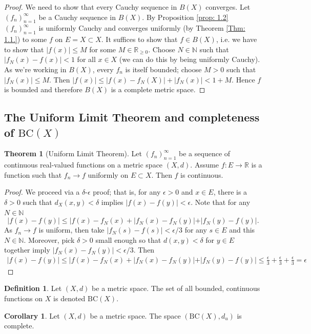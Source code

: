 \documentclass[oneside]{amsart}
\theoremstyle{definition}
\newtheorem{defi}{Definition}[section]
\newtheorem{theorem}{Theorem}[section]
\newtheorem{coro}{Corollary}[section]
\newcommand{\rr}{\mathbb R}
\newcommand{\nn}{\mathbb N}
\begin{document}
\begin{proof} We need to show that every Cauchy sequence in $B(X)$ converges. Let $(f_n)_{n=1}^\infty$ be a Cauchy sequence in $B(X)$. By Proposition \ref{prop: 1.2} $(f_n)_{n=1}^\infty$ is uniformly Cauchy and converges uniformly (by Theorem \ref{Thm: 1.1.}) to some $f$ on $E = X \subset X$. It suffices to show that $f \in B(X)$, i.e. we have to show that $|f(x)| \leq M$ for some $M \in \rr_{\geq 0}$. Choose $N \in \nn$ such that $|f_N(x) - f(x) | < 1$ for all $x \in X$ (we can do this by being uniformly Cauchy). As we're working in $B(X)$, every $f_n$ is itself bounded; choose $M > 0$ such that $|f_N(x)| \leq M$. Then $ |f(x)| \leq  |f(x) - f_N(X)| + |f_N(x)| < 1 +M$. Hence $f$ is bounded and therefore $B(X)$ is a complete metric space. 
\end{proof}
\subsection{The Uniform Limit Theorem and completeness of $\text{BC}(X)$ }
\begin{theorem}[Uniform Limit Theorem]
	Let $(f_n)_{n=1}^\infty$ be a sequence of continuous real-valued functions on a metric space $(X,d)$. Assume $f \colon E \to \rr$ is a function such that $f_n \to f$ uniformly on $E \subset X$. Then $f$ is continuous.
\end{theorem}
\begin{proof}
	We proceed via a $\delta$-$\epsilon$ proof; that is, for any $\epsilon > 0$ and $x \in E$, there is a $\delta > 0$ such that $d_X(x,y) < \delta$ implies $|f(x)-f(y)| < \epsilon$. Note that for any $N \in \nn$
	\[
	|f(x)-f(y)| \leq |f(x)-f_N(x)+|f_N(x)-f_N(y)|+|f_N(y)-f(y)|.
	\] As $f_n \to f$ is uniform, then take $|f_N(s)-f(s)| < \epsilon/3$ for any $s \in E$ and this $N \in \nn$. Moreover, pick $\delta > 0$ small enough so that $d(x,y) < \delta$ for $y \in E$ together imply $|f_N(x)-f_N(y)|<\epsilon/3$. Then 
	\begin{align*}
		|f(x)-f(y)| \leq |f(x)-f_N(x)+|f_N(x)-f_N(y)|+|f_N(y)-f(y)| \leq \frac{\epsilon}{3} + \frac{\epsilon}{3}+ \frac{\epsilon}{3} = \epsilon
	\end{align*}
\end{proof}
\begin{defi}
	Let $(X,d)$ be a metric space. The set of all bounded, continuous functions on $X$ is denoted $\text{BC} (X)$.
\end{defi}
\begin{coro}
Let $(X,d)$ be a metric space. The space $(\text{BC}(X), d_u)$ is complete. 	
\end{coro}
\end{document}
